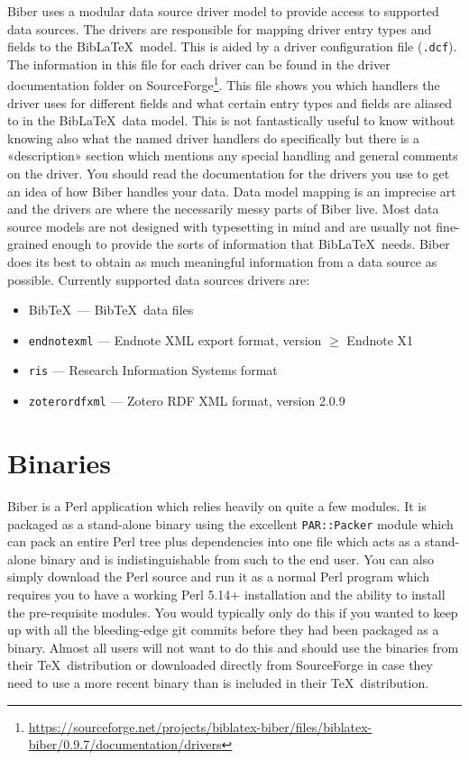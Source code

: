 \documentclass{ltxdockit}
\gdef\biberversion{0.9.7}    %
\begin{document}
Biber uses a modular data source driver model to provide access
to supported data sources. The drivers are responsible for mapping
driver entry types and fields to the Bib\LaTeX\ model. This is
aided by a driver configuration file (\verb+.dcf+). The information in
this file for each driver can be found in the driver documentation folder on
SourceForge\footnote{\url{https://sourceforge.net/projects/biblatex-biber/files/biblatex-biber/\biberversion/documentation/drivers}}. This
file shows you which handlers the driver uses for different fields and
what certain entry types and fields are aliased to in the
Bib\LaTeX\ data model. This is not fantastically useful to know
without knowing also what the named driver handlers do specifically but there
is a «description» section which mentions any special handling and
general comments on the driver. You should read the documentation for
the drivers you use to get an idea of how Biber handles your
data. Data model mapping is an imprecise art
and the drivers are where the necessarily messy parts of Biber
live. Most data source models are not designed with typesetting in
mind and are usually not fine-grained enough to provide the sorts of
information that Bib\LaTeX\ needs. Biber does its best to
obtain as much meaningful information from a data source as possible.
Currently supported data sources drivers are:

\begin{itemize}
\item Bib\TeX\ --- Bib\TeX\ data files
\item \verb+endnotexml+ --- Endnote XML export format, version $\geq$ Endnote X1
\item \verb+ris+ --- Research Information Systems format
\item \verb+zoterordfxml+ --- Zotero RDF XML format, version 2.0.9
\end{itemize}

\section{Binaries}\label{binaries}

Biber is a Perl application which relies heavily on quite a few
modules. It is packaged as a stand-alone binary using the excellent
\verb+PAR::Packer+ module which can pack an entire Perl tree plus
dependencies into one file which acts as a stand-alone binary and is
indistinguishable from such to the end user. You can also simply download
the Perl source and run it as a normal Perl program which
requires you to have a working Perl 5.14+ installation and the
ability to install the pre-requisite modules. You would typically only do
this if you wanted to keep up with all the bleeding-edge git commits before
they had been packaged as a binary. Almost all users will not want to do
this and should use the binaries from their \TeX\ distribution or downloaded
directly from SourceForge in case they need to use a more recent binary
than is included in their \TeX\ distribution.
\end{document}
